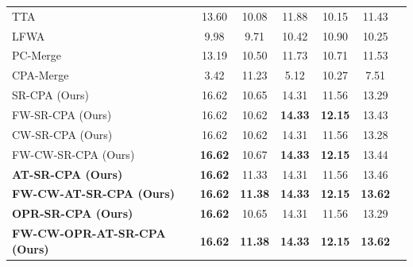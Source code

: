 \documentclass{article}
\theoremstyle{plain}
\theoremstyle{definition}
\theoremstyle{remark}
\begin{document}
\begin{table}[t]
\begin{center}
\begin{small}
\begin{sc}
\begin{tabular}{lccccc|c}
TTA & 13.60 & 10.08 & 11.88 & 10.15 & 11.43 \\
LFWA & 9.98 & 9.71 & 10.42 & 10.90 & 10.25 \\
PC-Merge & 13.19 & 10.50 & 11.73 & 10.71 & 11.53 \\
CPA-Merge & 3.42 & 11.23 & 5.12 & 10.27 & 7.51 \\
SR-CPA (Ours) & 16.62 & 10.65 & 14.31 & 11.56 & 13.29 \\
FW-SR-CPA (Ours) & 16.62 & 10.62 & \textbf{14.33} & \textbf{12.15} & 13.43 \\
CW-SR-CPA (Ours) & 16.62 & 10.62 & 14.31 & 11.56 & 13.28 \\
FW-CW-SR-CPA (Ours) & \textbf{16.62} & 10.67 & \textbf{14.33} & \textbf{12.15} & 13.44 \\
\textbf{AT-SR-CPA (Ours)} & \textbf{16.62} & 11.33 & 14.31 & 11.56 & 13.46 \\
\textbf{FW-CW-AT-SR-CPA (Ours)} & \textbf{16.62} & \textbf{11.38} & \textbf{14.33} & \textbf{12.15} & \textbf{13.62} \\
\textbf{OPR-SR-CPA (Ours)} & \textbf{16.62} & 10.65 & 14.31 & 11.56 & 13.29 \\
\textbf{FW-CW-OPR-AT-SR-CPA (Ours)} & \textbf{16.62} & \textbf{11.38} & \textbf{14.33} & \textbf{12.15} & \textbf{13.62} \\
\bottomrule
\end{tabular}
\end{sc}
\end{small}
\end{center}
\vskip -0.1in
\end{table}
\end{document}
